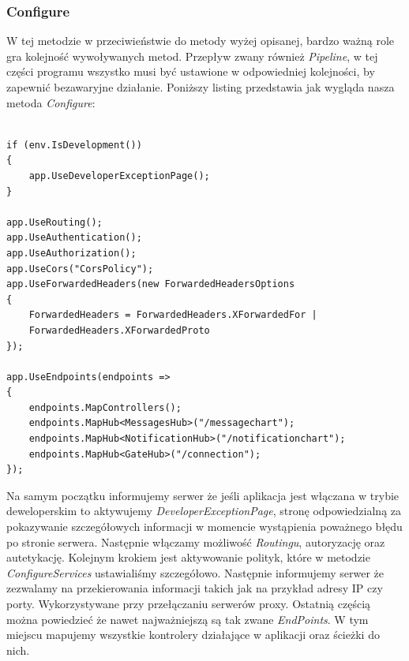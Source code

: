 \documentclass[12pt,a4paper]{article}
\begin{document}
\subsubsection{Configure}

\hspace*{0.7cm} W tej metodzie w przeciwieństwie do metody wyżej opisanej, bardzo ważną role gra kolejność wywoływanych metod. Przepływ zwany również \textit{Pipeline}, w tej części programu wszystko musi być ustawione w odpowiedniej kolejności, by zapewnić bezawaryjne działanie. Poniższy listing przedstawia jak wygląda nasza metoda \textit{Configure}:\newline

\begin{lstlisting}[caption={Metoda Configure}]

if (env.IsDevelopment())
{
	app.UseDeveloperExceptionPage();
}

app.UseRouting();
app.UseAuthentication();
app.UseAuthorization();
app.UseCors("CorsPolicy");
app.UseForwardedHeaders(new ForwardedHeadersOptions
{
	ForwardedHeaders = ForwardedHeaders.XForwardedFor |
	ForwardedHeaders.XForwardedProto
});

app.UseEndpoints(endpoints =>
{
	endpoints.MapControllers();
	endpoints.MapHub<MessagesHub>("/messagechart");
	endpoints.MapHub<NotificationHub>("/notificationchart");
	endpoints.MapHub<GateHub>("/connection");
});
\end{lstlisting}

\hspace*{0.7cm} Na samym początku informujemy serwer że jeśli aplikacja jest włączana w trybie deweloperskim to aktywujemy \textit{DeveloperExceptionPage}, stronę odpowiedzialną za pokazywanie szczegółowych informacji w momencie wystąpienia poważnego błędu po stronie serwera. Następnie włączamy możliwość \textit{Routingu}, autoryzację oraz autetykację. Kolejnym krokiem jest aktywowanie polityk, które w metodzie \textit{ConfigureServices} ustawialiśmy szczegółowo. Następnie informujemy serwer że zezwalamy na przekierowania informacji takich jak na przykład adresy IP czy porty. Wykorzystywane przy przełączaniu serwerów proxy. Ostatnią częścią można powiedzieć że nawet najważniejszą są tak zwane \textit{EndPoints}. W tym miejscu mapujemy wszystkie kontrolery działające w aplikacji oraz ścieżki do nich.

\end{document}
